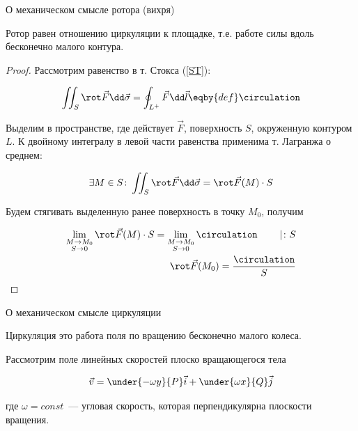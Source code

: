 
\begin{theorem}\label{rotor-m-sense}
  О механическом смысле ротора (вихря)

  Ротор равен отношению циркуляции к площадке, т.е. работе силы вдоль бесконечно
  малого контура.
\end{theorem}
\begin{proof}
  Рассмотрим равенство в т. Стокса (\ref{ST}):

  \begin{align*}
    \iint_{S} \rot \vec{F} \dd \vec{\sigma}
    = \oint_{L^{+}} \vec{F} \dd  \vec{l}
    \eqby{def} \circulation
  \end{align*}

  Выделим в пространстве, где действует \(\vec{F}\), поверхность \(S\),
  окруженную контуром \(L\). К двойному интегралу в левой части равенства
  применима т. Лагранжа о среднем:

  \begin{align*}
    \exists M \in S \colon
      \iint_{S} \rot \vec{F} \dd \vec{\sigma} = \rot \vec{F}(M) \cdot S
  \end{align*}

  Будем стягивать выделенную ранее поверхность в точку \(M_{0}\), получим

  \begin{align*}
    \lim_{\substack{M \to M_{0} \\ S \to 0}}
      \rot \vec{F}(M) \cdot S
    =
    \lim_{\substack{M \to M_{0} \\ S \to 0}}
      \circulation
    \hspace{20pt} \mid \colon S
    \\
    \rot \vec{F}(M_{0}) = \frac{\circulation}{S}
  \end{align*}
\end{proof}

\begin{theorem}
  О механическом смысле циркуляции

  Циркуляция это работа поля по вращению бесконечно малого колеса.
\end{theorem}

\begin{twocolumns}
  
  \columnbreak

  Рассмотрим поле линейных скоростей плоско вращающегося тела

  \begin{align*}
    \vec{v}= \under{-\omega y}{P} \vec{i} + \under{\omega x}{Q} \vec{j}
  \end{align*}

  где \(\omega = const\)~--- угловая скорость, которая перпендикулярна
  плоскости вращения.
\end{twocolumns}

